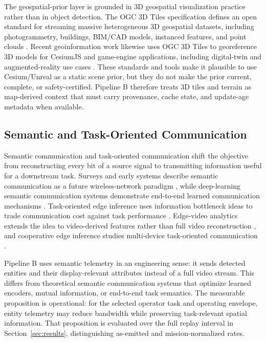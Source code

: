 \documentclass[fleqn]{VRIH2025}
\begin{document}
The geospatial-prior layer is grounded in 3D geospatial visualization practice rather than in object detection. The OGC 3D Tiles specification defines an open standard for streaming massive heterogeneous 3D geospatial datasets, including photogrammetry, buildings, BIM/CAD models, instanced features, and point clouds \cite{ogc2022threedtiles}. Recent geoinformation work likewise uses OGC 3D Tiles to georeference 3D models for CesiumJS and game-engine applications, including digital-twin and augmented-reality use cases \cite{shaji2025threedtiler}. These standards and tools make it plausible to use Cesium/Unreal as a static scene prior, but they do not make the prior current, complete, or safety-certified. Pipeline B therefore treats 3D tiles and terrain as map-derived context that must carry provenance, cache state, and update-age metadata when available.

\subsection{Semantic and Task-Oriented Communication}

Semantic communication and task-oriented communication shift the objective from reconstructing every bit of a source signal to transmitting information useful for a downstream task. Surveys and early systems describe semantic communication as a future wireless-network paradigm \cite{luo2022semantic}, while deep-learning semantic communication systems demonstrate end-to-end learned communication mechanisms \cite{xie2021semantic}. Task-oriented edge inference uses information bottleneck ideas to trade communication cost against task performance \cite{shao2022edgeinference}. Edge-video analytics extends the idea to video-derived features rather than full video reconstruction \cite{shao2024edgevideo}, and cooperative edge inference studies multi-device task-oriented communication \cite{shao2023multidevice}.

Pipeline B uses semantic telemetry in an engineering sense: it sends detected entities and their display-relevant attributes instead of a full video stream. This differs from theoretical semantic communication systems that optimize learned encoders, mutual information, or end-to-end task semantics. The measurable proposition is operational: for the selected operator task and operating envelope, entity telemetry may reduce bandwidth while preserving task-relevant spatial information. That proposition is evaluated over the full replay interval in Section~\ref{sec:results}, distinguishing as-emitted and mission-normalized rates.
\end{document}
